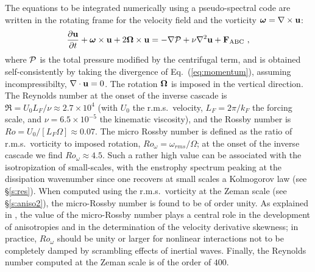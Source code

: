 \documentclass[aps,amsmath,amssymb,floatfix,showpacs]{revtex4}
\begin{document}
The equations to be integrated numerically using a pseudo-spectral code are written in the rotating frame for the velocity field and the vorticity $\mbox{\boldmath $\omega$} = \nabla \times {\bf u}$:
\begin{equation}
\frac{\partial {\bf u}}{\partial t} + \mbox{\boldmath $\omega$} 
    \times {\bf u} + 2 \mbox{\boldmath $\Omega$} \times {\bf u} =
    - \nabla {\cal P} + \nu \nabla^2 {\bf u} + {\bf F_{\rm ABC} } \ ,
\label{eq:momentum}
\end{equation}
where ${\cal P}$ is the total pressure  modified by the centrifugal term, and is obtained self-consistently by taking the divergence of Eq.~(\ref{eq:momentum}), assuming incompressibilty, $\nabla \cdot {\bf u}=0$. The rotation $\mbox{\boldmath $\Omega$}$ is imposed in the vertical direction. The Reynolds number at the onset of the inverse cascade is $\Re=U_0L_F/\nu\approx 2.7\times 10^4$ (with $U_0$ the r.m.s.~velocity, $L_F=2\pi/k_F$ the forcing scale, and $\nu=6.5 \times 10^{-5}$ the kinematic viscosity), and the Rossby number is $Ro= U_0/[L_F \Omega] \approx 0.07$. The micro Rossby number is defined as the ratio of r.m.s.~vorticity to imposed rotation, $Ro_{\omega}=\omega_{rms}/\Omega$; at the onset of the inverse cascade we find $Ro_{\omega}\approx 4.5$. Such a rather high value can be associated with the isotropization of small-scales, with the enstrophy spectrum peaking at the dissipation wavenumber since one recovers at small scales a Kolmogorov law (see \S \ref{s:res}). When computed using the r.m.s.~vorticity at the Zeman scale (see \S \ref{s:aniso2}), the micro-Rossby number is found to be of order unity. As explained in \citet{cambon97}, the value of the micro-Rossby number plays a central role in the development of anisotropies and in the determination of the velocity derivative skewness; in practice, $Ro_{\omega}$ should be unity or larger for nonlinear interactions not to be completely damped by scrambling effects of inertial waves. Finally, the Reynolds number computed at the Zeman scale is of the order of $400$.
\end{document}
